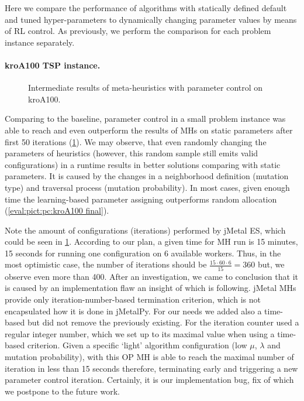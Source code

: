 Here we compare the performance of algorithms with statically defined default and tuned hyper-parameters to dynamically changing parameter values by means of RL control. As previously, we perform the comparison for each problem instance separately.

\newpage
\paragraph{kroA100 TSP instance.}
\begin{figure}[t]
	\centering
	
	\caption{Intermediate results of meta-heuristics with parameter control on kroA100.}
	\label{eval:pict:pc:kroA100 intermediate}
\end{figure}

Comparing to the baseline, parameter control in a small problem instance was able to reach and even outperform the results of MHs on static parameters after first 50 iterations (\cref{eval:pict:pc:kroA100 intermediate}). We may observe, that even randomly changing the parameters of heuristics (however, this random sample still emits valid configurations) in a runtime results in better solutions comparing with static parameters. It is caused by the changes in a neighborhood definition (mutation type) and traversal process (mutation probability). In most cases, given enough time the learning-based parameter assigning outperforms random allocation (\cref{eval:pict:pc:kroA100 final}).

Note the amount of configurations (iterations) performed by jMetal ES, which could be seen in \cref{eval:pict:pc:kroA100 intermediate}. According to our plan, a given time for MH run is 15 minutes, 15 seconds for running one configuration on 6 available workers. Thus, in the most optimistic case, the number of iterations should be $ \frac{15\cdot60\cdot6}{15} = 360$ but, we observe even more than 400. After an investigation, we came to conclusion that it is caused by an implementation flaw an insight of which is following. jMetal MHs provide only iteration-number-based termination criterion, which is not encapsulated how it is done in jMetalPy. For our needs we added also a time-based but did not remove the previously existing. For the iteration counter used a regular integer number, which we set up to its maximal value when using a time-based criterion. Given a specific `light' algorithm configuration (low $\mu$, $\lambda$ and mutation probability), with this OP MH is able to reach the maximal number of iteration in less than 15 seconds therefore, terminating early and triggering a new parameter control iteration. Certainly, it is our implementation bug, fix of which we postpone to the future work.


